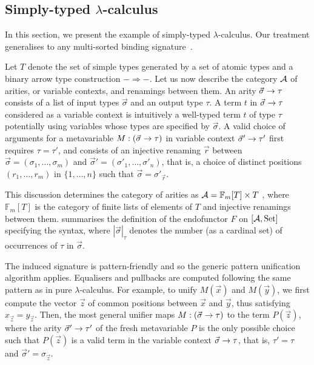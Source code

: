 \subsection{Simply-typed $\lambda$-calculus}

\label{subsec:simply-typed-so} In this section, we present the example
of simply-typed $\lambda$-calculus. Our treatment generalises to
any multi-sorted binding signature~\citet{FioreHur}. 

Let $T$ denote the set of simple types generated by a set of atomic
types and a binary arrow type construction $-\Rightarrow-$. Let us
now describe the category ${\cal A}$ of arities, or variable contexts,
and renamings between them. An arity $\vec{\sigma}\arSep\tau$ consists
of a list of input types $\vec{\sigma}$ and an output type $\tau$.
A term $t$ in $\vec{\sigma}\arSep\tau$ considered as a variable
context is intuitively a well-typed term $t$ of type $\tau$ potentially
using variables whose types are specified by $\vec{\sigma}$. A valid
choice of arguments for a metavariable $M:(\vec{\sigma}\arSep\tau)$
in variable context $\vec{\sigma}'\arSep\tau'$ first requires $\tau=\tau'$,
and consists of an injective renaming $\vec{r}$ between $\vec{\sigma}=(\sigma_{1},\dots,\sigma_{m})$
and $\vec{\sigma}'=(\sigma'_{1},\dots,\sigma'_{n})$, that is, a choice
of distinct positions $(r_{1},\dots,r_{m})$ in $\{1,\dots,n\}$ such
that $\vec{\sigma}=\sigma'_{\vec{r}}$.

This discussion determines the category of arities as ${\cal A}=\mathbb{F}_{m}[T]\times T$
, where $\mathbb{F}_{m}[T]$ is the category of finite lists of elements
of $T$ and injective renamings between them. 
summarises the definition of the endofunctor $F$ on $[{\cal A},\Set]$
specifying the syntax, where $|\vec{\sigma}|_{\tau}$ denotes the
number (as a cardinal set) of occurrences of $\tau$ in $\vec{\sigma}$.

The induced signature is pattern-friendly and so the generic pattern
unification algorithm applies. Equalisers and pullbacks are computed
following the same pattern as in pure $\lambda$-calculus. For example,
to unify $M(\vec{x})$ and $M(\vec{y})$, we first compute the vector
$\vec{z}$ of common positions between $\vec{x}$ and $\vec{y}$,
thus satisfying $x_{\vec{z}}=y_{\vec{z}}$. Then, the most general
unifier maps $M:(\vec{\sigma}\arSep\tau)$ to the term $P(\vec{z})$,
where the arity $\vec{\sigma}'\arSep\tau'$ of the fresh metavariable
$P$ is the only possible choice such that $P(\vec{z})$ is a valid
term in the variable context $\vec{\sigma}\arSep\tau$, that is, $\tau'=\tau$
and $\vec{\sigma}'=\sigma_{\vec{z}}$.

